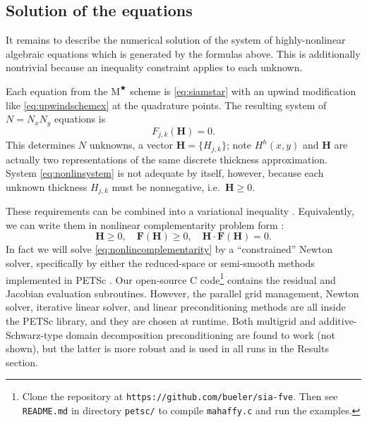 \documentclass[twocolumn,letterpaper]{igs}
\newcommand\bF{\mathbf{F}}
\newcommand\bH{\mathbf{H}}
\newcommand{\Mstar}{$\text{M}^{\bigstar}$\xspace}
\begin{document}
\subsection{Solution of the equations}

It remains to describe the numerical solution of the system of highly-nonlinear algebraic equations which is generated by the formulas above.  This is additionally nontrivial because an inequality constraint applies to each unknown.

Each equation from the \Mstar scheme is \eqref{eq:siamstar} with an upwind modification like \eqref{eq:upwindschemex} at the quadrature points.  The resulting system of $N=N_x N_y$ equations is
\begin{equation}
F_{j,k}(\bH) = 0.   \label{eq:nonlinsystem}
\end{equation}
This determines $N$ unknowns, a vector $\bH=\{H_{j,k}\}$; note $H^h(x,y)$ and $\bH$ are actually two representations of the same discrete thickness approximation.  System \eqref{eq:nonlinsystem} is not adequate by itself, however, because each unknown thickness $H_{j,k}$ must be nonnegative, i.e.~$\bH \ge 0$.

These requirements can be combined into a variational inequality \citep{JouvetBueler2012,KinderlehrerStampacchia1980}.  Equivalently, we can write them in nonlinear complementarity problem form \citep{BensonMunson2006}:
\begin{equation}
\bH \ge 0, \quad \bF(\bH) \ge 0, \quad \bH \cdot \bF(\bH) = 0.  \label{eq:nonlincomplementarity}
\end{equation}
In fact we will solve \eqref{eq:nonlincomplementarity} by a ``constrained'' Newton solver, specifically by either the reduced-space or semi-smooth methods \citep{BensonMunson2006} implemented in PETSc \citep{Balayetal2014}.  Our open-source C code\footnote{Clone the repository at \texttt{https://github.com/bueler/sia-fve}.  Then see \texttt{README.md} in directory \texttt{petsc/} to compile \texttt{mahaffy.c} and run the examples.} contains the residual and Jacobian evaluation subroutines.  However, the parallel grid management, Newton solver, iterative linear solver, and linear preconditioning methods are all inside the PETSc library, and they are chosen at runtime.  Both multigrid \citep{Briggsetal2000} and additive-Schwarz-type domain decomposition \citep{Smithetal1996} preconditioning are found to work (not shown), but the latter is more robust and is used in all runs in the Results section.
\end{document}

